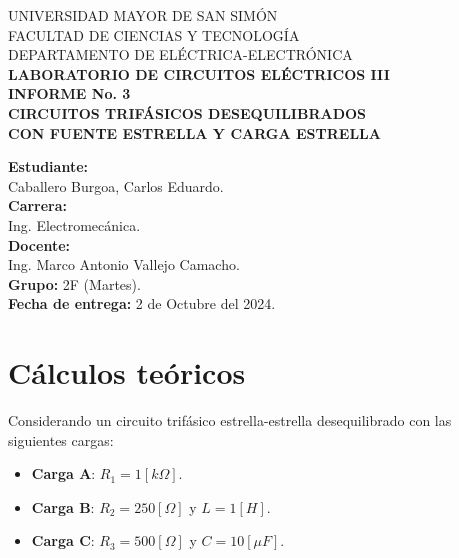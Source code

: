 \documentclass[letter,11pt]{article}
\begin{document}
\begin{titlepage}
    \begin{center}
        {\Large UNIVERSIDAD MAYOR DE SAN SIMÓN}\\
        \vspace*{0.15cm}
        {\large FACULTAD DE CIENCIAS Y TECNOLOGÍA}\\
        \vspace*{0.10cm}
        DEPARTAMENTO DE ELÉCTRICA-ELECTRÓNICA\\
        \vspace*{3.0cm}
        {\Large \textbf{LABORATORIO DE CIRCUITOS ELÉCTRICOS III}}\\
        \vspace*{0.3cm}
        {\Large \textbf{INFORME No. 3}}\\
        \vspace*{3.5cm}
        {\Large \textbf{CIRCUITOS TRIFÁSICOS DESEQUILIBRADOS \\
        CON FUENTE ESTRELLA Y CARGA ESTRELLA}}\\
    \end{center}

    \vspace*{5.8cm}
    \leftskip=7.95cm
    \noindent
    \textbf{Estudiante:}\\
    Caballero Burgoa, Carlos Eduardo.\\
    \newline
    \textbf{Carrera:}\\
    Ing. Electromecánica.\\
    \newline
    \textbf{Docente:}\\
    Ing. Marco Antonio Vallejo Camacho.\\
    \newline
    \textbf{Grupo:} 2F (Martes).\\
\textbf{Fecha de entrega:} 2 de Octubre del 2024.\\
\end{titlepage}

\section{Cálculos teóricos}
Considerando un circuito trifásico estrella-estrella desequilibrado con las
siguientes cargas:

\begin{itemize}
    \item \textbf{Carga A}: $R_1=1[k\Omega]$.
    \item \textbf{Carga B}: $R_2=250[\Omega]$ y $L=1[H]$.
    \item \textbf{Carga C}: $R_3=500[\Omega]$ y $C=10[\mu F]$.
\end{itemize}
\end{document}
